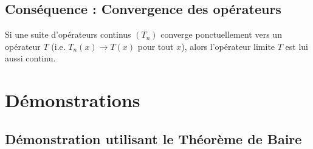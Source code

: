 \documentclass[11pt,a4paper]{article}
\begin{document}
\subsection{Conséquence : Convergence des opérateurs}

Si une suite d'opérateurs continus $(T_n)$ converge ponctuellement vers un opérateur $T$ (i.e. $T_n(x) \to T(x)$ pour tout $x$), alors l'opérateur limite $T$ est lui aussi continu.

\section{Démonstrations}

\subsection{Démonstration utilisant le Théorème de Baire}
\end{document}
